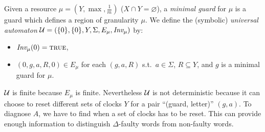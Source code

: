 \documentclass[letterpaper,10pt,conference]{ieeeconf}  \IEEEoverridecommandlockouts                              \overrideIEEEmargins
\def\st{{s.t.}~}
\def\emptyset{\varnothing}
\def\calU{{\cal U}}
\def\true{\mbox{\textsc{true}}}
\begin{document}
Given a resource $\mu=(Y,\max,\frac{1}{m})$ ($X \cap Y =\emptyset$), a
\emph{minimal guard} for $\mu$ is a guard which defines a region of
granularity $\mu$. We define the (symbolic) \emph{universal automaton}
$\calU=(\{0\},\{0\},Y,\Sigma,E_\mu,\inv_\mu)$ by:
\begin{itemize}
\item $\inv_\mu(0)=\true$,
\item $(0,g,a,R,0) \in E_\mu$ for each $(g,a,R)$ \st $a \in \Sigma$,
  $R \subseteq Y$, and $g$ is a minimal guard for $\mu$.
\end{itemize}

$\calU$ is finite because $E_\mu$ is finite.  Nevertheless $\calU$ is
not deterministic because it can choose to reset different sets of
clocks $Y$ for a pair ``(guard, letter)'' $(g,a)$.  To diagnose $A$,
we have to find when a set of clocks has to be reset. This can provide
enough information to distinguish $\Delta$-faulty words from
non-faulty words.
\end{document}
